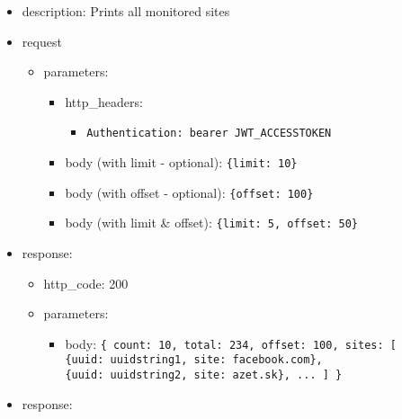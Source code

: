 \documentclass[
]{article}
\begin{document}
\begin{itemize}
\item
  description: Prints all monitored sites
\item
  request

  \begin{itemize}
  \item
    parameters:

    \begin{itemize}
    \item
      http\_headers:

      \begin{itemize}
      \item
        \texttt{Authentication:\ \textquotesingle{}bearer\ JWT\_ACCESSTOKEN\textquotesingle{}}
      \end{itemize}
    \item
      body (with limit - optional):
      \texttt{\{\textquotesingle{}limit\textquotesingle{}:\ 10\}}
    \item
      body (with offset - optional):
      \texttt{\{\textquotesingle{}offset\textquotesingle{}:\ 100\}}
    \item
      body (with limit \& offset):
      \texttt{\{\textquotesingle{}limit\textquotesingle{}:\ 5,\ \textquotesingle{}offset\textquotesingle{}:\ 50\}}
    \end{itemize}
  \end{itemize}
\item
  response:

  \begin{itemize}
  \item
    http\_code: 200
  \item
    parameters:

    \begin{itemize}
    \item
      body: \texttt{\{
      \textquotesingle{}count\textquotesingle{}:\ 10,
      \textquotesingle{}total\textquotesingle{}:\ 234,
      \textquotesingle{}offset\textquotesingle{}:\ 100,
      \textquotesingle{}sites\textquotesingle{}:\ {[}
      	\{\textquotesingle{}uuid\textquotesingle{}:\ \textquotesingle{}uuidstring1\textquotesingle{},\ \textquotesingle{}site\textquotesingle{}:\ \textquotesingle{}facebook.com\textquotesingle{}\},
      	\{\textquotesingle{}uuid\textquotesingle{}:\ \textquotesingle{}uuidstring2\textquotesingle{},\ \textquotesingle{}site\textquotesingle{}:\ \textquotesingle{}azet.sk\textquotesingle{}\},
      	...
      {]}
      \}}
    \end{itemize}
  \end{itemize}
\item
  response:


\end{itemize}
\end{document}
